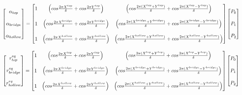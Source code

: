 \documentclass[12pt]{article}
\begin{document}
\[
\resizebox{\textwidth}{!}{$%
\begin{bmatrix}
\alpha_{top} \\ \\ \alpha_{bridge} \\ \\ \alpha_{hollow}
\end{bmatrix}
=
\begin{bmatrix}
1 & \Big( cos \frac{2\pi X^{top}}{\delta} + cos\frac{2\pi Y^{top}}{\delta} \Big) & \Big( cos \frac{2\pi (X^{top} + Y^{top})}{\delta} + cos\frac{2\pi (X^{top} - Y^{top})}{\delta}\Big) \\ \\
1 & \Big( cos \frac{2\pi X^{bridge}}{\delta} + cos\frac{2\pi Y^{bridge}}{\delta} \Big) & \Big( cos \frac{2\pi (X^{bridge} + Y^{bridge})}{\delta} + cos\frac{2\pi (X^{bridge} - Y^{bridge})}{\delta}\Big) \\ \\
1 & \Big( cos \frac{2\pi X^{hollow}}{\delta} + cos\frac{2\pi Y^{hollow}}{\delta} \Big) & \Big( cos \frac{2\pi (X^{hollow} + Y^{hollow})}{\delta} + cos\frac{2\pi (X^{hollow} - Y^{hollow})}{\delta}\Big) 
\end{bmatrix}
\begin{bmatrix}
P_0 \\ \\ P_1 \\ \\P_2  
\end{bmatrix}$%
}
\]

\[
\resizebox{\textwidth}{!}{$%
\begin{bmatrix}
r^{eq}_{top} \\ \\r^{eq}_{bridge} \\ \\ r^{eq}_{hollow}
\end{bmatrix}
=
\begin{bmatrix}
1 & \Big( cos \frac{2\pi X^{top}}{\delta} + cos\frac{2\pi Y^{top}}{\delta} \Big) & \Big( cos \frac{2\pi (X^{top} + Y^{top})}{\delta} + cos\frac{2\pi (X^{top} - Y^{top})}{\delta}\Big) \\ \\
1 & \Big( cos \frac{2\pi X^{bridge}}{\delta} + cos\frac{2\pi Y^{bridge}}{\delta} \Big) & \Big( cos \frac{2\pi (X^{bridge} + Y^{bridge})}{\delta} + cos\frac{2\pi (X^{bridge} - Y^{bridge})}{\delta}\Big) \\ \\
1 & \Big( cos \frac{2\pi X^{hollow}}{\delta} + cos\frac{2\pi Y^{hollow}}{\delta} \Big) & \Big( cos \frac{2\pi (X^{hollow} + Y^{hollow})}{\delta} + cos\frac{2\pi (X^{hollow} - Y^{hollow})}{\delta}\Big) 
\end{bmatrix}
\begin{bmatrix}
P_0 \\ \\ P_1 \\ \\P_2  
\end{bmatrix}$%
}
\]
\end{document}
